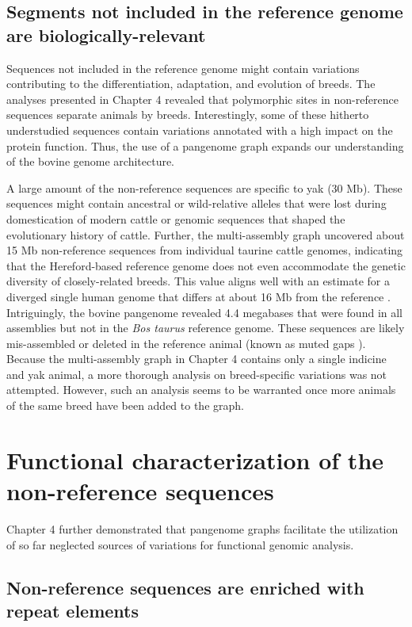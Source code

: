 \documentclass[../main.tex]{subfiles}
\begin{document}
\subsection*{Segments not included in the reference genome are biologically-relevant}

Sequences not included in the reference genome might contain variations contributing to the differentiation, adaptation, and evolution of breeds. The analyses presented in Chapter 4 revealed that polymorphic sites in non-reference sequences separate animals by breeds. Interestingly, some of these hitherto understudied sequences contain variations annotated with a high impact on the protein function. Thus, the use of a pangenome graph expands our understanding of the bovine genome architecture. 

A large amount of the non-reference sequences are specific to yak (30 Mb). These sequences might contain ancestral or wild-relative alleles that were lost during domestication of modern cattle or genomic sequences that shaped the evolutionary history of cattle. Further, the multi-assembly graph uncovered about 15 Mb non-reference sequences from individual taurine cattle genomes, indicating that the Hereford-based reference genome does not even accommodate the genetic diversity of closely-related breeds. This value aligns well with an estimate for a diverged single human genome that differs at about 16 Mb from the reference \citep{huddleston2017discovery}. Intriguingly, the bovine pangenome revealed 4.4 megabases that were found in all assemblies but not in the \emph{Bos taurus} reference genome. These sequences are likely mis-assembled  or deleted in the reference animal (known as muted gaps \citep{audano2019characterizing}). Because the multi-assembly graph in Chapter 4 contains only a single indicine and yak animal, a more thorough analysis on breed-specific variations was not attempted. However, such an analysis seems to be warranted once more animals of the same breed have been added to the graph.

\section{Functional characterization of the non-reference sequences}

Chapter 4 further demonstrated that pangenome graphs facilitate the utilization of so far neglected sources of variations for functional genomic analysis. 

\subsection*{Non-reference sequences are enriched with repeat elements}
\end{document}
